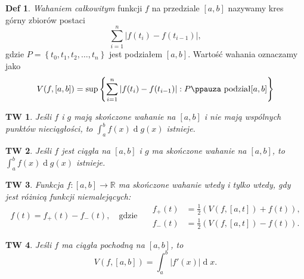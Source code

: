 \documentclass[a4paper, 12pt]{mwart}
\theoremstyle{definition}
\newtheorem{definicja}{Def}[section]
\theoremstyle{plain}
\newtheorem{twierdzenie}{TW}[section]
\theoremstyle{remark}
\begin{document}
\begin{definicja}
	\emph{Wahaniem całkowitym} funkcji $f$ na przedziale $[a, b]$ nazywamy kres górny zbiorów postaci
	\begin{equation}
		\sum_{i = 1}^n |f(t_i) - f(t_{i-1})|,
	\end{equation}
	gdzie $P = \left\{t_0, t_1, t_2, \ldots, t_n\right\}$ jest podziałem $[a, b]$.
	Wartość wahania oznaczamy jako
	\begin{equation}
		V(f, [a, b]) = \sup\left\{\sum_{i = 1}^n |f(t_i) - f(t_{i-1})| : P \text{\ppauza podział} [a, b]\right\}
	\end{equation}
\end{definicja}
\begin{twierdzenie}
	Jeśli $f$ i $g$ mają skończone wahanie na $[a, b]$ i nie mają wspólnych punktów nieciągłości, to $\int_a^b f(x)\operatorname{d}\!g(x)$ istnieje.
\end{twierdzenie}
\begin{twierdzenie}
	Jeśli $f$ jest ciągła na $[a, b]$ i $g$ ma skończone wahanie na $[a, b]$, to $\int_a^b f(x)\operatorname{d}\!g(x)$ istnieje.
\end{twierdzenie}
\begin{twierdzenie}
	Funkcja $f:[a, b] \to\mathbb{R}$ ma skończone wahanie wtedy i tylko wtedy, gdy jest różnicą funkcji niemalejących:
	\begin{equation}
		\begin{gathered}
			f(t) = f_+(t) - f_-(t), \quad \text{gdzie} \quad
		\end{gathered}
		\begin{aligned}
			f_+(t) &= \frac{1}{2}\left(V(f, [a, t]) + f(t)\right), \\
			f_-(t) &= \frac{1}{2}\left(V(f, [a, t]) - f(t)\right).
		\end{aligned}
	\end{equation}
\end{twierdzenie}
\begin{twierdzenie}
	Jeśli $f$ ma ciągła pochodną na $[a, b]$, to
	\begin{equation}
		V(f, [a, b]) = \int_a^b |f'(x)|\operatorname{d}\!x.
	\end{equation}
\end{twierdzenie}
\end{document}
